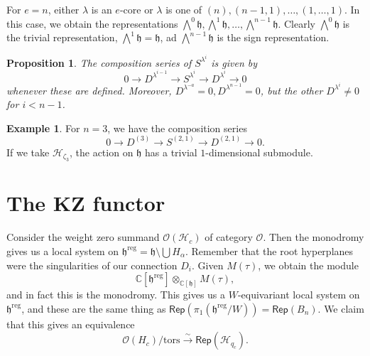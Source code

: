\documentclass[leqno, openany]{memoir}
\newtheorem{prop}[thm]{Proposition}
\theoremstyle{definition}
\newtheorem{exm}[thm]{Example}
\theoremstyle{remark}
\theoremstyle{plain}
\theoremstyle{definition}
\theoremstyle{remark}
\newcommand{\C}{\mathbb{C}}
\newcommand{\h}{\mathfrak{h}}
\newcommand{\mc}[1]{\mathcal{#1}}
\newcommand{\mr}[1]{\mathrm{#1}}
\newcommand{\ms}[1]{\mathsf{#1}}
\newcommand{\1}{\mathbf{1}}
\newcommand{\2}{\mathbf{2}}
\newcommand{\3}{\mathbf{3}}
\begin{document}
For $e = n$, either $\lambda$ is an $e$-core or $\lambda$ is one of $(n), (n-1,1), \ldots, (1,\ldots,1)$. In this case, we obtain the representations $\bigwedge^0 \h, \bigwedge^1 \h, \ldots, \bigwedge^{n-1} \h$. Clearly $\bigwedge^0 \h$ is the trivial representation, $\bigwedge^1 \h = \h$, ad $\bigwedge^{n-1} \h$ is the sign representation.

\begin{prop}
    The composition series of $S^{\lambda^i}$ is given by
    \[ 0 \to D^{\lambda^{i-1}} \to S^{\lambda^i} \to D^{\lambda^i} \to 0 \]
    whenever these are defined. Moreover, $D^{\lambda^{-a}} = 0, D^{\lambda^{n-1}} = 0$, but the other $D^{\lambda^i} \neq 0$ for $i < n-1$.
\end{prop}

\begin{exm}
    For $n = 3$, we have the composition series
    \[ 0 \to D^{(3)} \to S^{(2,1)} \to D^{(2,1)} \to 0. \]
    If we take $\mc{H}_{\zeta_3}$, the action on $\h$ has a trivial $1$-dimensional submodule.
\end{exm}

\section{The KZ functor}%
\label{sec:the_kz_functor}

Consider the weight zero summand $\mc{O}(\mc{H}_c)$ of category $\mc{O}$. Then the monodromy gives us a local system on $\h^{\mr{reg}} = \h \setminus \bigcup H_{\alpha}$. Remember that the root hyperplanes were the singularities of our connection $D_i$. Given $M(\tau)$, we obtain the module
\[ \C[\h^{\mr{reg}}] \otimes_{\C[\h]} M(\tau), \]
and in fact this is the monodromy. This gives us a $W$-equivariant local system on $\h^{\mr{reg}}$, and these are the same thing as $\ms{Rep}(\pi_1(\h^{\mr{reg}} / W)) = \ms{Rep}(B_n)$. We claim that this gives an equivalence
\[ \mc{O}(H_c) / \mr{tors} \xrightarrow{\sim} \ms{Rep}(\mc{H}_{q_c}). \]
\end{document}
